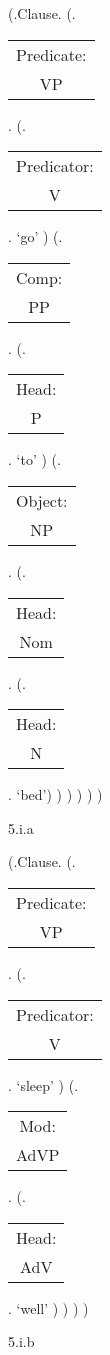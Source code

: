 \documentclass[12pt,letterpaper]{article}
\begin{document}
\begin{figure}
	\begin{center}
		\begin{parsetree}
			(.Clause.
			(.\begin{tabular}{c}Predicate:\\VP\end{tabular}.
			(.\begin{tabular}{c}Predicator:\\V\end{tabular}.    `go' )
			(.\begin{tabular}{c}Comp:\\PP\end{tabular}.
			(.\begin{tabular}{c}Head:\\P\end{tabular}.    `to' )
			(.\begin{tabular}{c}Object:\\NP\end{tabular}.
			(.\begin{tabular}{c}Head:\\Nom\end{tabular}.
			(.\begin{tabular}{c}Head:\\N\end{tabular}. `bed')
			)
			)
			)
			)
			)
			
			\hfill \break\hfill \break
		\end{parsetree}
		5.i.a
	\end{center}
\end{figure}


\begin{figure}
	\begin{center}
		\begin{parsetree}
			(.Clause.
			(.\begin{tabular}{c}Predicate:\\VP\end{tabular}.
			(.\begin{tabular}{c}Predicator:\\V\end{tabular}.    `sleep' )
			(.\begin{tabular}{c}Mod:\\AdVP\end{tabular}.
			(.\begin{tabular}{c}Head:\\AdV\end{tabular}.    `well' )
			)
			)
			)
			
			\hfill \break\hfill \break
		\end{parsetree}
		5.i.b
	\end{center}
\end{figure}
\end{document}
